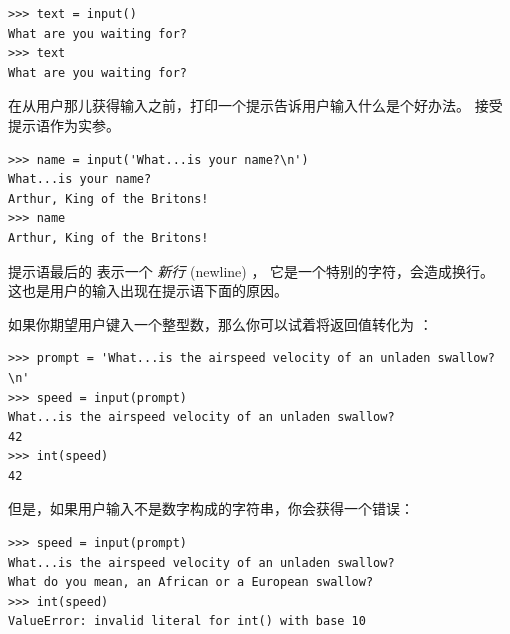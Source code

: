 {{{{    

\begin{lstlisting}
>>> text = input()
What are you waiting for?
>>> text
What are you waiting for?
\end{lstlisting}

%

在从用户那儿获得输入之前，打印一个提示告诉用户输入什么是个好办法。
 接受提示语作为实参。

\begin{lstlisting}
>>> name = input('What...is your name?\n')
What...is your name?
Arthur, King of the Britons!
>>> name
Arthur, King of the Britons!
\end{lstlisting}

%

提示语最后的 \li{\n} 表示一个 {\em 新行} (newline) ，
它是一个特别的字符，会造成换行。 这也是用户的输入出现在提示语下面的原因。


如果你期望用户键入一个整型数，那么你可以试着将返回值转化为  ：

\begin{lstlisting}
>>> prompt = 'What...is the airspeed velocity of an unladen swallow?\n'
>>> speed = input(prompt)
What...is the airspeed velocity of an unladen swallow?
42
>>> int(speed)
42
\end{lstlisting}

%

但是，如果用户输入不是数字构成的字符串，你会获得一个错误：

\begin{lstlisting}
>>> speed = input(prompt)
What...is the airspeed velocity of an unladen swallow?
What do you mean, an African or a European swallow?
>>> int(speed)
ValueError: invalid literal for int() with base 10
\end{lstlisting}

%

}}}}
